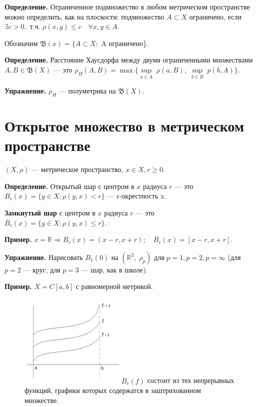 \documentclass[12pt,a4paper]{article}
\begin{document}
\textbf{Определение.} Ограниченное подмножество в любом метрическом пространстве можно определить, как на плоскости: подмножество $A \subset X$ ограничено, если $\exists c > 0,$ т.ч. $\rho(x, y) \leq c \quad \forall x, y \in A$. 

Обозначим $\mathfrak{B}(x) = \{A \subset X\!\!:$ A ограничено\}. 

\textbf{Определение.} Расстояние Хаусдорфа между двумя ограниченными множествами $A, B \in \mathfrak{B}(X)$ --- это $\rho_{H}(A, B) = \max{\{\underset{a \in A}{\sup} \; \rho(a, B), \; \underset{b \in B}{\sup} \; p(b, A)}\}.$ 

\textbf{Упражнение.} $\rho_{H}$ --- полуметрика на $\mathfrak{B}(X)$. 

\section{Открытое множество в метрическом пространстве}
	
$(X, \rho)$ --- метрическое пространство, $x \in X, r \geq 0$.
	
\textbf{Определение.} Открытый шар с центром в $x$ радиуса $r$ --- это 
$B_r(x) = \{y \in X\!\!: \rho(y, x) < r\}$ --- r-окрестность x. 
	
\textbf{Замкнутый шар} с центром в $x$ радиуса $r$ --- это
$\overline{B}_r(x) = \{y\in X\!\!: \rho(y, x) \leq r\}.$
	
\textbf{Пример.} $x = \mathbb{R} \Rightarrow B_r(x) = (x - r, x + r); \quad \overline{B}_r(x) = [x - r, x+r].$
	
\textbf{Упражнение.} Нарисовать $B_1(0)$ на $(\mathbb{R}^2, \; \rho_p)$ для $p = 1, p = 2, p = \infty$ (для $p = 2$ --- круг, для $p = 3$ --- шар, как в школе).
	
\textbf{Пример.} $X = C[a,b]$ с равномерной метрикой.
	
\begin{figure}
	\includegraphics[width = 5cm]{lect2_1.png}
	$\overline{B}_r(f)$ состоит из тех непрерывных функций, графики которых содержатся в заштрихованном множестве.
\end{figure}
	
\end{document}
